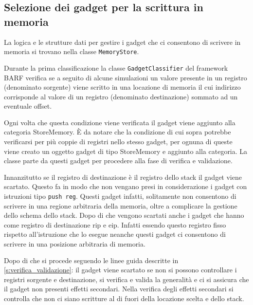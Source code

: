 \subsection{Selezione dei gadget per la scrittura in memoria}
\label{sec:memorystore}

La logica e le strutture dati per gestire i gadget che ci consentono
di scrivere in memoria si trovano nella classe
\lstinline{MemoryStore}. 

Durante la prima classificazione la classe
\lstinline{GadgetClassifier} del framework BARF verifica se a seguito
di alcune simulazioni un valore presente in un registro (denominato
sorgente) viene scritto in una locazione di memoria il cui indirizzo
corrisponde al valore di un registro (denominato destinazione) sommato
ad un eventuale offset.

Ogni volta che questa condizione viene verificata il gadget viene
aggiunto alla categoria StoreMemory. È da notare che la condizione di
cui sopra potrebbe verificarsi per più coppie di registri nello stesso
gadget, per ognuna di queste viene creato un oggetto gadget di tipo
StoreMemory e aggiunto alla categoria. La classe parte da questi
gadget per procedere alla fase di verifica e validazione.

Innanzitutto se il registro di destinazione è il registro dello stack
il gadget viene scartato. Questo fa in modo che non vengano presi in
considerazione i gadget con istruzioni tipo \lstinline{push reg}.
Questi gadget infatti, solitamente non consentono di scrivere in una
regione arbitraria della memoria, oltre a complicare la gestione dello
schema dello stack. Dopo di che vengono scartati anche i gadget che
hanno come registro di destinazione rip e eip. Infatti essendo questo
registro fisso rispetto all'istruzione che lo esegue neanche questi
gadget ci consentono di scrivere in una posizione arbitraria di
memoria.

Dopo di che si procede seguendo le linee guida descritte in
\ref{s:verifica_validazione}: il gadget viene scartato se non si
possono controllare i registri sorgente e destinazione, si verifica e
valida la generalità e ci si assicura che il gadget non presenti
effetti secondari. Nella verifica degli effetti secondari si controlla
che non ci siano scritture al di fuori della locazione scelta e dello
stack.


